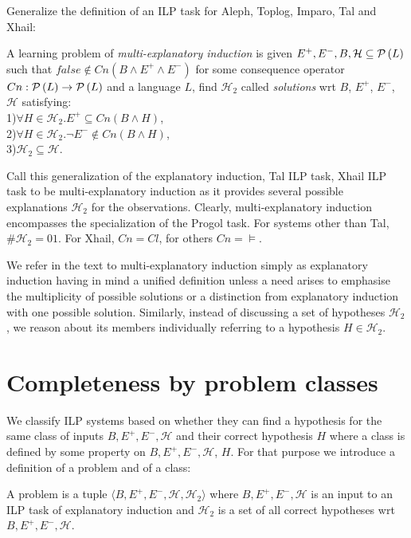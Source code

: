 Generalize the definition of an ILP task for Aleph, Toplog, Imparo, Tal and Xhail:

\begin{defn}A learning problem of \emph{multi-explanatory induction} is
given $E^{+}, E^{-}, B, \mathcal{H} \subseteq \mathcal{P} \left({ L }\right)$ such that $false \not\in Cn(B \land E^{+} \land E^{-})$ for some consequence operator $Cn:\mathcal{P} \left({ L }\right) \to \mathcal{P} \left({ L }\right)$ and a language $L$,
find $\mathcal{H}_2$ called \emph{solutions} wrt $B$, $E^+$, $E^-$, $\mathcal{H}$ satisfying:\\
1)$\forall H \in \mathcal{H}_2. E^{+} \subseteq Cn(B \land H)$,\\
2)$\forall H \in \mathcal{H}_2. \neg E^{-} \not\in Cn(B \land H)$,\\
3)$\mathcal{H}_2 \subseteq \mathcal{H}$.

\end{defn}
Call this generalization of the explanatory induction, Tal ILP task, Xhail ILP task to be multi-explanatory induction as it provides several possible  explanations $\mathcal{H}_2$ for the observations. Clearly, multi-explanatory induction encompasses the specialization of the Progol task. For systems other than Tal, $\#\mathcal{H}_2=01$. For Xhail, $Cn=Cl$, for others $Cn=\models$.

We refer in the text to multi-explanatory induction simply as explanatory induction having in mind a unified definition unless a need arises to emphasise the multiplicity of possible solutions or a distinction from explanatory induction with one possible solution. Similarly, instead of discussing a set of hypotheses $\mathcal{H}_2$, we reason about its members individually referring to a hypothesis $H \in \mathcal{H}_2$.
\section{Completeness by problem classes}\label{completeness_by_problem_classes}
We classify ILP systems based on whether they can find a hypothesis for the same class of inputs $B, E^+, E^-, \mathcal{H}$ and their correct hypothesis $H$ where a class is defined by some property on $B, E^+, E^-, \mathcal{H}$, $H$. For that purpose we introduce a definition of a problem and of a class:

\begin{defn}
A problem is a tuple $\langle B, E^+, E^-, \mathcal{H}, \mathcal{H}_2 \rangle$ where
$B, E^+, E^-, \mathcal{H}$ is an input to an ILP task of explanatory induction and $\mathcal{H}_2$ is a set of all correct hypotheses wrt $B, E^+, E^-, \mathcal{H}$.
\end{defn}


